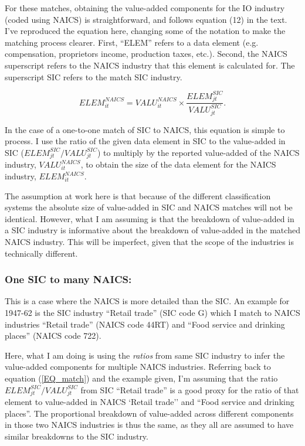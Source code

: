 \documentclass[11pt]{article}
\begin{document}
For these matches, obtaining the value-added components for the IO industry (coded using NAICS) is straightforward, and follows equation (12) in the text. I've reproduced the equation here, changing some of the notation to make the matching process clearer. First, ``ELEM'' refers to a data element (e.g. compensation, proprietors income, production taxes, etc.). Second, the NAICS superscript refers to the NAICS industry that this element is calculated for. The superscript SIC refers to the match SIC industry. 

\begin{equation}
	ELEM_{it}^{NAICS} = VALU_{it}^{NAICS} \times \frac{ELEM_{jt}^{SIC}}{VALU_{jt}^{SIC}}. \label{EQ_match}
\end{equation}

In the case of a one-to-one match of SIC to NAICS, this equation is simple to process. I use the ratio of the given data element in SIC to the value-added in SIC ($ELEM_{jt}^{SIC}/VALU_{jt}^{SIC}$) to multiply by the reported value-added of the NAICS industry, $VALU_{it}^{NAICS}$, to obtain the size of the data element for the NAICS industry, $ELEM_{it}^{NAICS}$. 

The assumption at work here is that because of the different classification systems the absolute size of value-added in SIC and NAICS matches will not be identical. However, what I am assuming is that the breakdown of value-added in a SIC industry is informative about the breakdown of value-added in the matched NAICS industry. This will be imperfect, given that the scope of the industries is technically different. 

\subsubsection{One SIC to many NAICS:} This is a case where the NAICS is more detailed than the SIC. An example for 1947-62 is the SIC industry ``Retail trade'' (SIC code G) which I match to NAICS industries ``Retail trade'' (NAICS code 44RT) and ``Food service and drinking places'' (NAICS code 722). 

Here, what I am doing is using the \textit{ratios} from same SIC industry to infer the value-added components for multiple NAICS industries. Referring back to equation (\ref{EQ_match}) and the example given, I'm assuming that the ratio $ELEM_{jt}^{SIC}/VALU_{jt}^{SIC}$ from SIC ``Retail trade'' is a good proxy for the ratio of that element to value-added in NAICS `Retail trade'' and ``Food service and drinking places''. The proportional breakdown of value-added across different components in those two NAICS industries is thus the same, as they all are assumed to have similar breakdowns to the SIC industry. 
\end{document}
